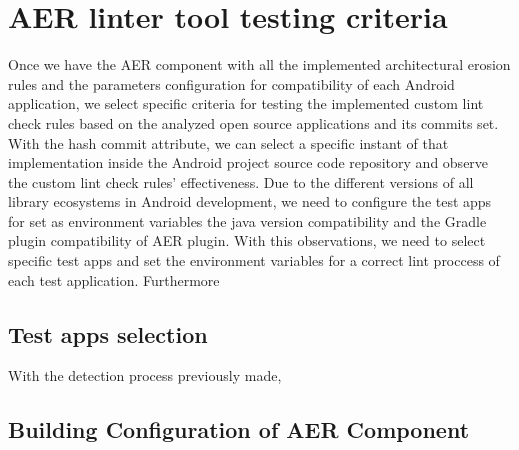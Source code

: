 \section{AER linter tool testing criteria}
Once we have the AER component with all the implemented architectural erosion rules and the parameters configuration for compatibility of each Android application, we select specific criteria for testing the implemented custom lint check rules based on the analyzed open source applications and its commits set. With the hash commit attribute, we can select a specific instant of that implementation inside the Android project source code repository and observe the custom lint check rules' effectiveness. Due to the different versions of all library ecosystems in Android development, we need to configure the test apps for set as environment variables the java version compatibility and the Gradle plugin compatibility of AER plugin. With this observations, we need to select specific test apps and set the environment variables for a correct lint proccess of each test application.
Furthermore

\subsection{Test apps selection}
With the detection process previously made,

\subsection{Building Configuration of AER Component}
